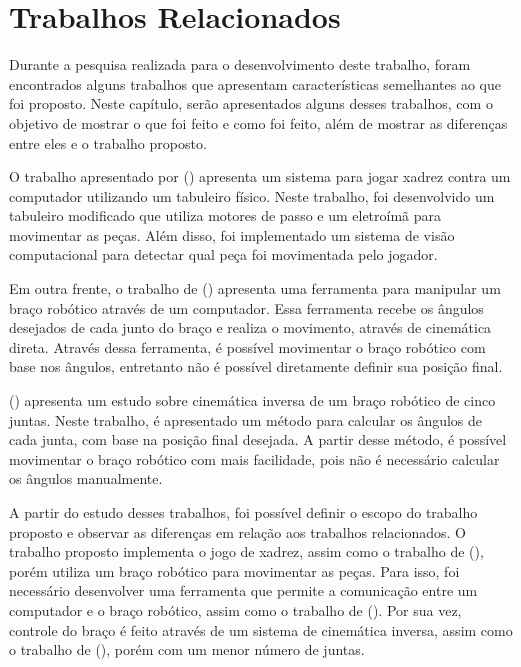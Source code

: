 \chapter[Trabalhos Relacionados]{Trabalhos Relacionados}
\label{cap:trabalhosRelacionados}

Durante a pesquisa realizada para o desenvolvimento deste trabalho, foram encontrados alguns trabalhos que apresentam características semelhantes ao que foi proposto.
Neste capítulo, serão apresentados alguns desses trabalhos, com o objetivo de mostrar o que foi feito e como foi feito, além de mostrar as diferenças entre eles e o trabalho proposto.

O trabalho apresentado por \citeauthor{jogador_xadrez} (\citeyear{jogador_xadrez}) apresenta um sistema para jogar xadrez contra um computador utilizando um tabuleiro físico.
Neste trabalho, foi desenvolvido um tabuleiro modificado que utiliza motores de passo e um eletroímã para movimentar as peças.
Além disso, foi implementado um sistema de visão computacional para detectar qual peça foi movimentada pelo jogador.

Em outra frente, o trabalho de \citeauthor{ferramenta_braco_robotico} (\citeyear{ferramenta_braco_robotico}) apresenta uma ferramenta para manipular um braço robótico através de um computador.
Essa ferramenta recebe os ângulos desejados de cada junto do braço e realiza o movimento, através de cinemática direta.
Através dessa ferramenta, é possível movimentar o braço robótico com base nos ângulos,
entretanto não é possível diretamente definir sua posição final.

\citeauthor{inverse_kinematics_five_joint} (\citeyear{inverse_kinematics_five_joint}) apresenta um estudo sobre cinemática inversa de um braço robótico de cinco juntas.
Neste trabalho, é apresentado um método para calcular os ângulos de cada junta, com base na posição final desejada.
A partir desse método, é possível movimentar o braço robótico com mais facilidade, pois não é necessário calcular os ângulos manualmente.

A partir do estudo desses trabalhos, foi possível definir o escopo do trabalho proposto e observar as diferenças em relação aos trabalhos relacionados.
O trabalho proposto implementa o jogo de xadrez, assim como o trabalho de \citeauthor{jogador_xadrez} (\citeyear{jogador_xadrez}), porém utiliza um braço robótico para movimentar as peças.
Para isso, foi necessário desenvolver uma ferramenta que permite a comunicação entre um computador e o braço robótico, assim como o trabalho de \citeauthor{ferramenta_braco_robotico} (\citeyear{ferramenta_braco_robotico}). 
Por sua vez, controle do braço é feito através de um sistema de cinemática inversa, assim como o trabalho de \citeauthor{inverse_kinematics_five_joint} (\citeyear{inverse_kinematics_five_joint}), porém com um menor número de juntas.